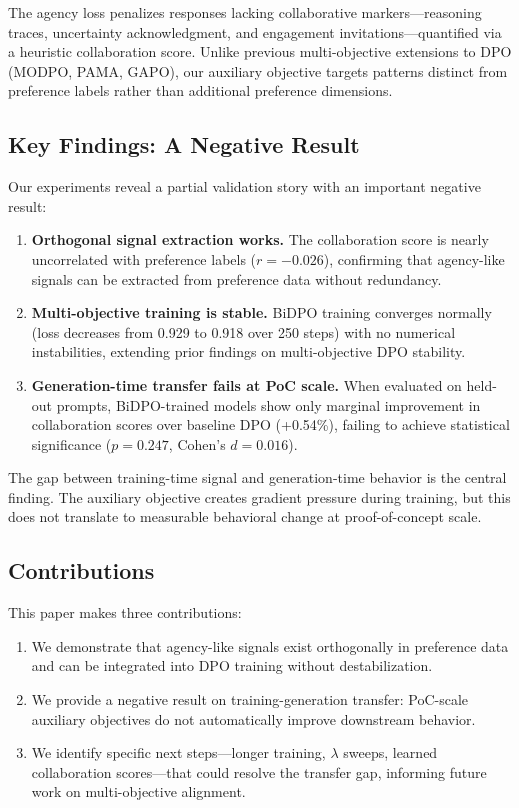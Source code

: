 The agency loss penalizes responses lacking collaborative markers---reasoning traces, uncertainty acknowledgment, and engagement invitations---quantified via a heuristic collaboration score. Unlike previous multi-objective extensions to DPO (MODPO, PAMA, GAPO), our auxiliary objective targets patterns distinct from preference labels rather than additional preference dimensions.

\subsection{Key Findings: A Negative Result}

Our experiments reveal a partial validation story with an important negative result:

\begin{enumerate}
\item \textbf{Orthogonal signal extraction works.} The collaboration score is nearly uncorrelated with preference labels ($r = -0.026$), confirming that agency-like signals can be extracted from preference data without redundancy.

\item \textbf{Multi-objective training is stable.} BiDPO training converges normally (loss decreases from 0.929 to 0.918 over 250 steps) with no numerical instabilities, extending prior findings on multi-objective DPO stability.

\item \textbf{Generation-time transfer fails at PoC scale.} When evaluated on held-out prompts, BiDPO-trained models show only marginal improvement in collaboration scores over baseline DPO (+0.54\%), failing to achieve statistical significance ($p = 0.247$, Cohen's $d = 0.016$).
\end{enumerate}

The gap between training-time signal and generation-time behavior is the central finding. The auxiliary objective creates gradient pressure during training, but this does not translate to measurable behavioral change at proof-of-concept scale.

\subsection{Contributions}

This paper makes three contributions:

\begin{enumerate}
\item We demonstrate that agency-like signals exist orthogonally in preference data and can be integrated into DPO training without destabilization.

\item We provide a negative result on training-generation transfer: PoC-scale auxiliary objectives do not automatically improve downstream behavior.

\item We identify specific next steps---longer training, $\lambda$ sweeps, learned collaboration scores---that could resolve the transfer gap, informing future work on multi-objective alignment.
\end{enumerate}
